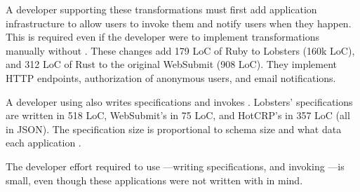 A developer supporting these transformations must first add application
infrastructure to allow users to invoke them and notify users when they happen.
This is required even if the developer were to implement transformations
manually without \sys.
%
These changes add 179 LoC of Ruby to Lobsters (160k LoC), and 312 LoC of Rust
to the original WebSubmit (908 LoC). They implement HTTP endpoints,
authorization of anonymous users, and email notifications.
%

%
A developer using \sys also writes \xx specifications and invokes \sys.
Lobsters' \xx specifications are written in 518 LoC, WebSubmit's in 75 LoC, and
HotCRP's in 357 LoC (all in JSON).  The specification size is proportional to
schema size and what data each application \xxs.
%
%

%
The developer effort required to use \sys---writing \sys specifications, and
invoking \sys---is small, even though these applications were not written with
\sys in mind.

%
%

%
%
%

